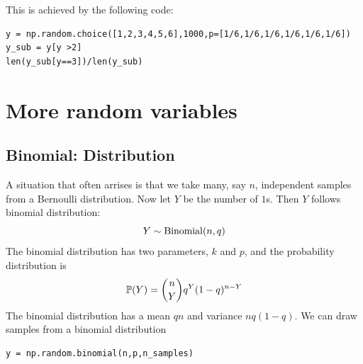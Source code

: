 \begin{solution}
This is achieved by the following code:
\begin{Verbatim}
y = np.random.choice([1,2,3,4,5,6],1000,p=[1/6,1/6,1/6,1/6,1/6,1/6])
y_sub = y[y >2]
len(y_sub[y==3])/len(y_sub)
\end{Verbatim}
\end{solution}









\section{More random variables}

 \subsection{Binomial: Distribution}
A situation that often arrises is that we take many, say $n$, independent samples from a Bernoulli distribution. Now let $Y$ be the number of $1$s. Then $Y$ follows {\dfn binomial distribution}:
\begin{equation}
Y \sim {\rm Binomial}(n,q)
\end{equation}
The binomial distribution has two parameters, $k$ and $p$, and the probability distribution is
\begin{equation}
\mathbb P(Y) = {n \choose Y}q^{Y}(1-q)^{n-Y}
\end{equation}
The binomial distribution has a mean $qn$ and variance $nq(1-q)$.
We can draw samples from a binomial distribution
 \begin{Verbatim}
y = np.random.binomial(n,p,n_samples)
 \end{Verbatim}


